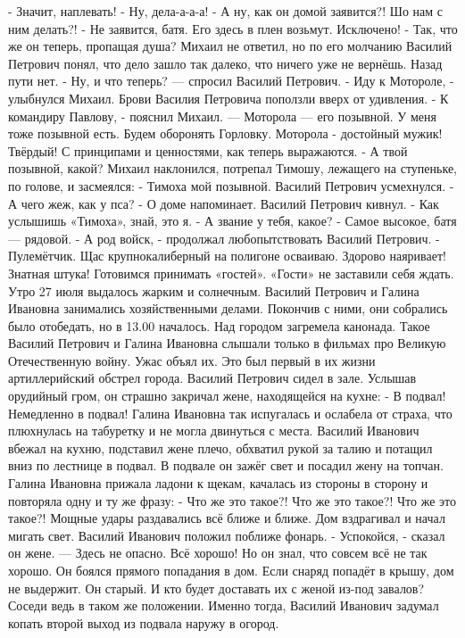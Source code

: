 - Значит, наплевать!
- Ну, дела-а-а-а!
- А ну, как он домой заявится?! Шо нам с ним делать?!
- Не заявится, батя. Его здесь в плен возьмут. Исключено!
- Так, что же он теперь, пропащая душа?
Михаил не ответил, но по его молчанию Василий Петрович понял, что дело зашло так далеко, что ничего уже не вернёшь. Назад пути нет.
- Ну, и что теперь? --- спросил Василий Петрович.
- Иду к Мотороле, - улыбнулся Михаил.
Брови Василия Петровича поползли вверх от удивления.
- К командиру Павлову, - пояснил Михаил. --- Моторола --- его позывной. У меня тоже позывной есть. Будем оборонять Горловку. Моторола - достойный мужик! Твёрдый! С принципами и ценностями, как теперь выражаются.
- А твой позывной, какой?
Михаил наклонился, потрепал Тимошу, лежащего на ступеньке, по голове, и засмеялся:
- Тимоха мой позывной.
Василий Петрович усмехнулся.
- А чего жеж, как у пса?
- О доме напоминает.
Василий Петрович кивнул.
- Как услышишь «Тимоха», знай, это я.
- А звание у тебя, какое?
- Самое высокое, батя --- рядовой.
- А род войск, - продолжал любопытствовать Василий Петрович.
- Пулемётчик. Щас крупнокалиберный на полигоне осваиваю. Здорово наяривает! Знатная штука! Готовимся принимать «гостей».
«Гости» не заставили себя ждать.
Утро  27 июля выдалось жарким и солнечным. Василий Петрович и Галина Ивановна занимались хозяйственными делами. Покончив с ними, они собрались было отобедать, но в 13.00 началось. Над городом загремела канонада. Такое Василий Петрович и Галина Ивановна слышали только в фильмах про Великую Отечественную войну. Ужас объял их. Это был первый в их жизни артиллерийский обстрел города.
Василий Петрович сидел в зале. Услышав орудийный гром, он страшно закричал жене, находящейся на кухне: - В подвал! Немедленно в подвал!
Галина Ивановна так испугалась и ослабела от страха, что плюхнулась на табуретку и не могла двинуться с места. Василий Иванович вбежал на кухню, подставил жене плечо, обхватил рукой за талию и потащил вниз по лестнице в подвал. В подвале он зажёг свет и посадил жену на топчан. Галина Ивановна прижала ладони к щекам, качалась из стороны в сторону и повторяла одну и ту же фразу: - Что же это такое?! Что же это такое?! Что же это такое?!
Мощные удары раздавались всё ближе и ближе. Дом вздрагивал и начал мигать свет. Василий Иванович положил поближе фонарь.
- Успокойся, - сказал он жене. --- Здесь не опасно.  Всё хорошо!
Но он знал, что совсем всё не так хорошо. Он боялся прямого попадания в дом. Если снаряд попадёт в крышу, дом не выдержит. Он старый. И кто будет доставать их с женой из-под завалов? Соседи ведь в таком же положении. Именно тогда, Василий Иванович задумал копать второй выход из подвала наружу в огород.
